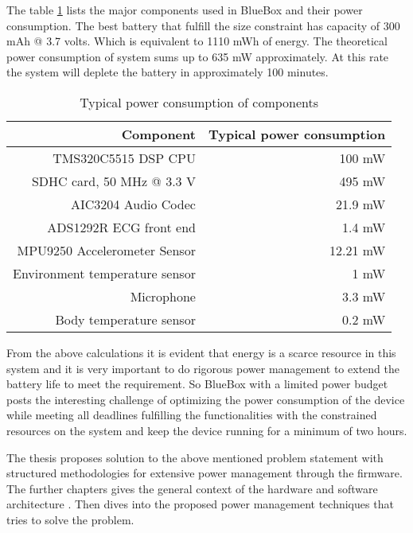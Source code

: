 The table \ref{table:power_rating} lists the major components used in BlueBox and their power consumption. The best battery that fulfill the size constraint has capacity of 300 mAh @ 3.7 volts. Which is equivalent to 1110 mWh of energy. The theoretical power consumption of system sums up to 635 mW approximately. At this rate the system will deplete the battery in approximately 100 minutes. 
\begin{table}[h]
	\centering
	\begin{tabular}{|r|r|}
		\hline
		Component & Typical power consumption\\
		\hline
		TMS320C5515 DSP CPU &  100 mW \\
		SDHC card, 50 MHz @ 3.3 V   &  495 mW \\
		AIC3204 Audio Codec  &  21.9 mW \\	
		ADS1292R ECG front end & 1.4 mW \\
		MPU9250 Accelerometer Sensor &  12.21 mW \\
		Environment temperature sensor  &  1 mW \\
		Microphone  & 3.3 mW \\
		Body temperature sensor  &  0.2 mW \\	
		\hline
	\end{tabular}
	\caption{Typical power consumption of components}
	\label{table:power_rating}
\end{table}

From the above  calculations it is evident that energy is a scarce resource in this system and it is very important to do rigorous power management to extend the battery life to meet the requirement. So BlueBox with a limited power budget posts the interesting challenge of optimizing the power consumption of the  device while meeting all deadlines fulfilling the functionalities with the constrained resources on the system and keep the device running for a minimum of two hours.

The thesis proposes solution to the above mentioned problem statement with structured methodologies for extensive power management through the firmware. The further chapters gives the general context of the hardware and software architecture . Then dives into the proposed power management techniques that tries to solve the problem.



